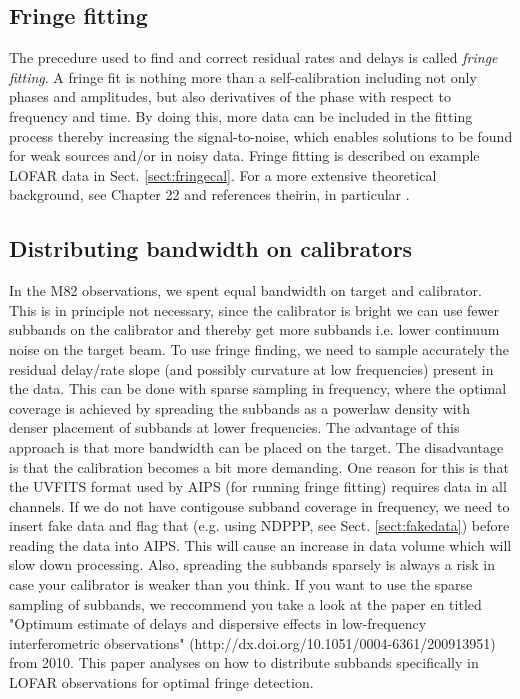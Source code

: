 \subsection{Fringe fitting}
The precedure used to find and correct residual rates and delays is called
\emph{fringe fitting}. A fringe fit is nothing more than a self-calibration
including not only phases and amplitudes, but also derivatives of the phase
with respect to frequency and time.  By doing this, more data can be included
in the fitting process thereby increasing the signal-to-noise, which enables
solutions to be found for weak sources and/or in noisy data. Fringe fitting is
described on example LOFAR data in Sect. \ref{sect:fringecal}. For a more
extensive theoretical background, see \cite{NRAO} Chapter 22 and references
theirin, in particular \cite{thompson}.


\subsection{Distributing bandwidth on calibrators}
In the M82 observations, we spent equal bandwidth on target and calibrator. This is
in principle not necessary, since the calibrator is bright we can use fewer subbands
on the calibrator and thereby get more subbands i.e. lower continuum noise on the target beam.
To use fringe finding, we need to sample accurately the residual delay/rate slope (and possibly curvature at
low frequencies) present in the data. This can be done with sparse sampling in frequency,
where the optimal coverage is achieved by spreading the subbands as a powerlaw density with
denser placement of subbands at lower frequencies. The advantage of this 
approach is that more bandwidth can be placed on the target. The disadvantage is that
the calibration becomes a bit more demanding. One reason for this is that the UVFITS
format used by AIPS (for running fringe fitting) requires data in all channels.
If we do not have contigouse subband coverage in frequency, we need to insert fake
data and flag that (e.g. using NDPPP, see Sect. \ref{sect:fakedata}) before reading
the data into AIPS. This will cause an increase in data volume which will slow down
processing. Also, spreading the subbands sparsely is always a risk in case your calibrator
is weaker than you think. 
If you want to use the sparse sampling of subbands, we reccommend you take a look
at the paper en titled "Optimum estimate of delays and dispersive effects in
low-frequency interferometric observations"
(http://dx.doi.org/10.1051/0004-6361/200913951) from 2010. This paper analyses
on how to distribute subbands specifically in LOFAR observations for optimal
fringe detection.

